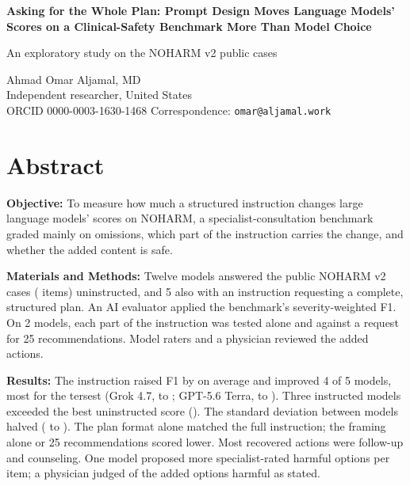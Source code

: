 \documentclass[11pt]{article}
\begin{document}
\begin{center}
{\Large\bfseries Asking for the Whole Plan: Prompt Design Moves Language Models' Scores on a
Clinical-Safety Benchmark More Than Model Choice\par}
\vspace{6pt}
{\large An exploratory study on the NOHARM v2 public cases\par}
\vspace{12pt}
Ahmad Omar Aljamal, MD\\
Independent researcher, United States\\
ORCID 0000-0003-1630-1468 \quad Correspondence: \texttt{omar@aljamal.work}
\end{center}

\noindent{}
\medskip

\onehalfspacing

\section*{Abstract}
\noindent\textbf{Objective:} To measure how much a structured instruction changes large language
models' scores on NOHARM, a specialist-consultation benchmark graded mainly on omissions, which part
of the instruction carries the change, and whether the added content is safe.

\noindent\textbf{Materials and Methods:} Twelve models answered the \nCases{} public NOHARM v2
cases (\nItems{} items) uninstructed, and 5 also with an instruction requesting a complete,
structured plan. An AI evaluator applied the benchmark's severity-weighted F1. On 2
models, each part of the instruction was tested alone and against a request for 25
recommendations. Model raters and a physician reviewed the added actions.

\noindent\textbf{Results:} The instruction raised F1 by \covPaperGridMeanGain{} on average
\covPaperGridMeanGainCI{} and improved 4 of 5 models, most for the tersest (Grok 4.7,
\covFGrokBare{} to \covFGrokThorough{}; GPT-5.6 Terra, \covFTerraBare{} to \covFTerraSpec{}). Three
instructed models exceeded the best uninstructed score (\covFSonnetBare{}). The standard deviation between models halved (\covPaperGridSdBare{} to
\covPaperGridSdSpec{}). The plan format alone matched the full instruction; the framing alone or 25
recommendations scored lower. Most recovered actions were
follow-up and counseling. One model proposed \covHarmSonnetDiff{} more specialist-rated harmful
options per item;
a physician judged \covPhysHarmful{} of the \covPhysOptions{} added options harmful as stated.
\end{document}
